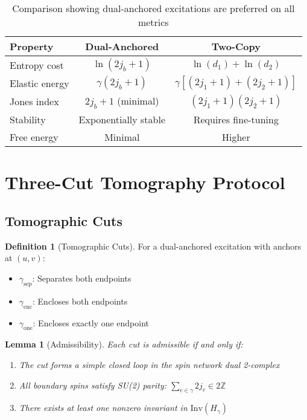 \documentclass[11pt]{article}
\newcommand{\Inv}{\mathrm{Inv}}
\theoremstyle{plain}
\newtheorem{lemma}[theorem]{Lemma}
\theoremstyle{definition}
\newtheorem{definition}[theorem]{Definition}
\begin{document}
\begin{table}[h]
  \centering
  \begin{tabular}{lcc}
    \hline
    \textbf{Property} & \textbf{Dual-Anchored} & \textbf{Two-Copy} \\
    \hline
    Entropy cost & $\ln(2j_b+1)$ & $\ln(d_1) + \ln(d_2)$ \\
    Elastic energy & $\gamma (2j_b+1)$ & $\gamma[(2j_1+1) + (2j_2+1)]$ \\
    Jones index & $2j_b+1$ (minimal) & $(2j_1+1)(2j_2+1)$ \\
    Stability & Exponentially stable & Requires fine-tuning \\
    Free energy & Minimal & Higher \\
    \hline
  \end{tabular}
  \caption{Comparison showing dual-anchored excitations are preferred on all metrics}
\end{table}

\section{Three-Cut Tomography Protocol}
\label{sec:tomography}

\subsection{Tomographic Cuts}

\begin{definition}[Tomographic Cuts]
  For a dual-anchored excitation with anchors at $(u,v)$:
  \begin{itemize}
    \item $\gamma_{\mathrm{sep}}$: Separates both endpoints
    \item $\gamma_{\mathrm{enc}}$: Encloses both endpoints
    \item $\gamma_{\mathrm{one}}$: Encloses exactly one endpoint
  \end{itemize}
\end{definition}

\begin{lemma}[Admissibility]
  \label{lem:admissibility}
  Each cut is \emph{admissible} if and only if:
  \begin{enumerate}
    \item The cut forms a simple closed loop in the spin network dual 2-complex
    \item All boundary spins satisfy SU(2) parity: $\sum_{e \in \gamma} 2 j_e \in 2\mathbb{Z}$
    \item There exists at least one nonzero invariant in $\Inv(H_{\gamma})$
  \end{enumerate}
\end{lemma}
\end{document}
